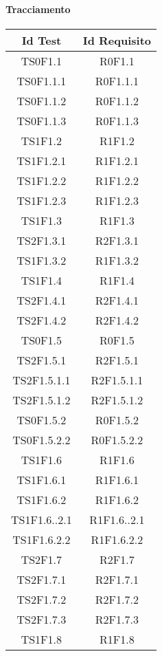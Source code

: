     \paragraph{Tracciamento} \Spazio
    
    \begin{longtable}{|c|c|}
    	\hline
    	\textbf{Id Test} & \textbf{Id Requisito}\\
    	\hline
    	\endhead
    	TS0F1.1&R0F1.1\\ \hline
    	TS0F1.1.1&R0F1.1.1 \\ \hline
    	TS0F1.1.2&R0F1.1.2 \\ \hline
    	TS0F1.1.3&R0F1.1.3 \\ \hline
    	TS1F1.2&R1F1.2 \\ \hline
    	TS1F1.2.1&R1F1.2.1 \\ \hline
    	TS1F1.2.2&R1F1.2.2 \\ \hline
    	TS1F1.2.3&R1F1.2.3 \\ \hline
    	TS1F1.3&R1F1.3 \\ \hline
    	TS2F1.3.1&R2F1.3.1 \\ \hline
    	TS1F1.3.2&R1F1.3.2 \\ \hline
    	TS1F1.4&R1F1.4 \\ \hline
    	TS2F1.4.1&R2F1.4.1 \\ \hline
    	TS2F1.4.2&R2F1.4.2 \\ \hline
    	TS0F1.5&R0F1.5 \\ \hline
    	TS2F1.5.1&R2F1.5.1 \\ \hline
    	TS2F1.5.1.1&R2F1.5.1.1 \\ \hline
    	TS2F1.5.1.2&R2F1.5.1.2 \\ \hline
    	TS0F1.5.2&R0F1.5.2 \\ \hline
    	TS0F1.5.2.2&R0F1.5.2.2 \\ \hline
    	TS1F1.6&R1F1.6 \\ \hline
    	TS1F1.6.1&R1F1.6.1 \\ \hline
    	TS1F1.6.2&R1F1.6.2 \\ \hline
    	TS1F1.6..2.1&R1F1.6..2.1 \\ \hline
    	TS1F1.6.2.2&R1F1.6.2.2 \\ \hline
    	TS2F1.7&R2F1.7 \\ \hline
    	TS2F1.7.1&R2F1.7.1 \\ \hline
    	TS2F1.7.2&R2F1.7.2 \\ \hline
    	TS2F1.7.3&R2F1.7.3 \\ \hline
    	TS1F1.8&R1F1.8 \\ \hline

\end{longtable}

